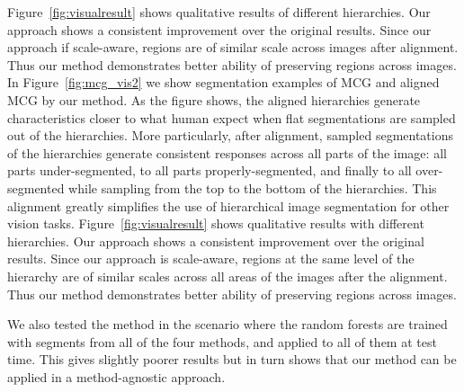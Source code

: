 Figure~\ref{fig:visualresult} shows qualitative results of different hierarchies. Our approach shows a consistent improvement over the original results. Since our approach if scale-aware, regions are of similar scale across images after alignment. Thus our method demonstrates better ability of preserving regions across images. In Figure~\ref{fig:mcg_vis2} we show segmentation examples of MCG and
aligned MCG by our method. As the figure shows, the aligned
hierarchies generate characteristics closer to what human expect when
flat segmentations are sampled out of the hierarchies. More
particularly, after alignment, sampled segmentations of the
hierarchies generate consistent responses across all parts of the
image: all parts under-segmented, to all parts properly-segmented, and
finally to all over-segmented while sampling from the top to the
bottom of the hierarchies. This alignment greatly simplifies the use
of hierarchical image segmentation for other vision tasks.
Figure~\ref{fig:visualresult} shows qualitative results with
different hierarchies. Our approach shows a consistent improvement
over the original results. Since our approach is scale-aware, regions
at the same level of the hierarchy are of similar scales across all
areas of the images after the alignment. Thus our method demonstrates
better ability of preserving regions across images.

We also tested the method in the scenario where the random forests are
trained with segments from all of the four methods, and applied to all
of them at test time. This gives slightly poorer results but in turn shows 
that our method can be applied in a method-agnostic approach.


